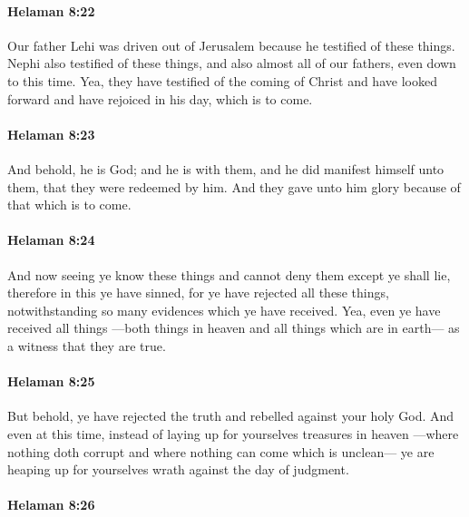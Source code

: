 		\paragraph{Helaman 8:22} %
			\label{HELAMAN-8-22}

			Our father Lehi was driven out of Jerusalem
			because he testified of these things.
			Nephi also testified of these things,
			and also almost all of our fathers, even down to this time.
			Yea, they have testified of the coming of Christ
			and have looked forward
			and have rejoiced in his day, which is to come.

		\paragraph{Helaman 8:23} %
			\label{HELAMAN-8-23}

			And behold, he is God;
			and he is with them,
			and he did manifest himself unto them,
			that they were redeemed by him.
			And they gave unto him glory because of that which is to come.

		\paragraph{Helaman 8:24} %
			\label{HELAMAN-8-24}

			And now seeing ye know these things
			and cannot deny them except ye shall lie,
			therefore in this ye have sinned,
			for ye have rejected all these things,
			notwithstanding so many evidences which ye have received.
			Yea, even ye have received all things
			---both things in heaven and all things which are in earth---
			as a witness that they are true.

		\paragraph{Helaman 8:25} %
			\label{HELAMAN-8-25}

			But behold, ye have rejected the truth
			and rebelled against your holy God.
			And even at this time,
			instead of laying up for yourselves treasures in heaven
			---where nothing doth corrupt
			and where nothing can come which is unclean---
			ye are heaping up for yourselves wrath against the day of judgment.

		\paragraph{Helaman 8:26} %
			\label{HELAMAN-8-26}


